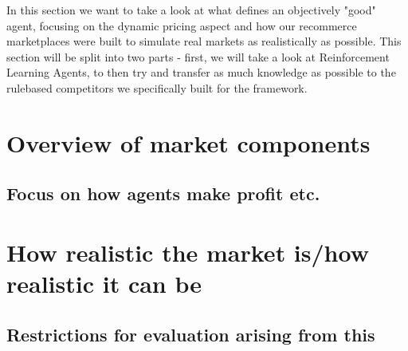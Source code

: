 \begin{jointwork}
	In this section we want to take a look at what defines an objectively "good" agent, focusing on the dynamic pricing aspect and how our recommerce marketplaces were built to simulate real markets as realistically as possible. This section will be split into two parts - first, we will take a look at Reinforcement Learning Agents, to then try and transfer as much knowledge as possible to the rulebased competitors we specifically built for the framework.
\end{jointwork}




\section{Overview of market components}
\subsection{Focus on how agents make profit etc.}
\section{How realistic the market is/how realistic it can be}
\subsection{Restrictions for evaluation arising from this}